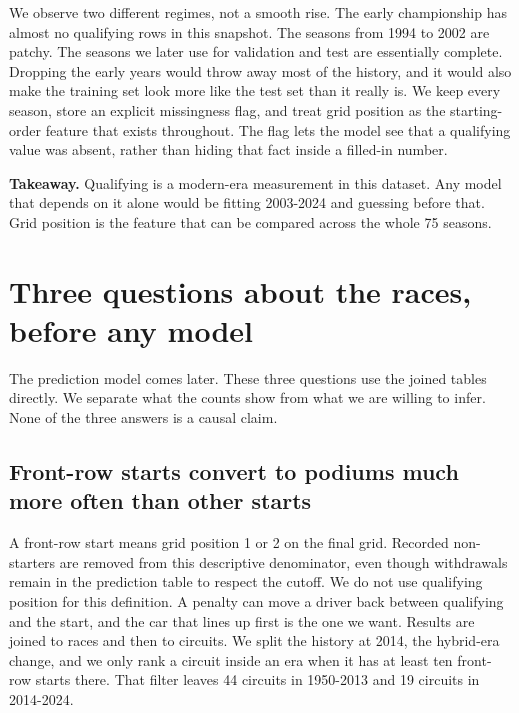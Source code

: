 \documentclass[10pt,a4paper]{article}
\begin{document}
We observe two different regimes, not a smooth rise. The early championship has almost no qualifying rows in this snapshot. The seasons from 1994 to 2002 are patchy. The seasons we later use for validation and test are essentially complete. Dropping the early years would throw away most of the history, and it would also make the training set look more like the test set than it really is. We keep every season, store an explicit missingness flag, and treat grid position as the starting-order feature that exists throughout. The flag lets the model see that a qualifying value was absent, rather than hiding that fact inside a filled-in number.


\begin{takeaway}
\textbf{Takeaway.} Qualifying is a modern-era measurement in this dataset. Any model that depends on it alone would be fitting 2003-2024 and guessing before that. Grid position is the feature that can be compared across the whole 75 seasons.
\end{takeaway}



\section{Three questions about the races, before any model}


The prediction model comes later. These three questions use the joined tables directly. We separate what the counts show from what we are willing to infer. None of the three answers is a causal claim.



\subsection{Front-row starts convert to podiums much more often than other starts}


A front-row start means grid position 1 or 2 on the final grid. Recorded non-starters are removed from this descriptive denominator, even though withdrawals remain in the prediction table to respect the cutoff. We do not use qualifying position for this definition. A penalty can move a driver back between qualifying and the start, and the car that lines up first is the one we want. Results are joined to races and then to circuits. We split the history at 2014, the hybrid-era change, and we only rank a circuit inside an era when it has at least ten front-row starts there. That filter leaves 44 circuits in 1950-2013 and 19 circuits in 2014-2024.
\end{document}
